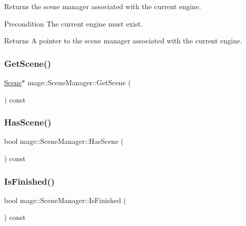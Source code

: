 Returns the scene manager associated with the current engine.

\begin{DoxyPrecond}{Precondition}
The current engine must exist. 
\end{DoxyPrecond}
\begin{DoxyReturn}{Returns}
A pointer to the scene manager associated with the current engine. 
\end{DoxyReturn}
\hypertarget{classmage_1_1_scene_manager_a55d720c9f90cfc46dbf07d46537072c1}{}\label{classmage_1_1_scene_manager_a55d720c9f90cfc46dbf07d46537072c1} 
\subsubsection{\texorpdfstring{Get\+Scene()}{GetScene()}}
{\footnotesize\ttfamily \hyperlink{classmage_1_1_scene}{Scene}$\ast$ mage\+::\+Scene\+Manager\+::\+Get\+Scene (\begin{DoxyParamCaption}{ }\end{DoxyParamCaption}) const\hspace{0.3cm}{\ttfamily [noexcept]}}

\hypertarget{classmage_1_1_scene_manager_ac767593112ea1d8b47cc79283cf7c47e}{}\label{classmage_1_1_scene_manager_ac767593112ea1d8b47cc79283cf7c47e} 
\subsubsection{\texorpdfstring{Has\+Scene()}{HasScene()}}
{\footnotesize\ttfamily bool mage\+::\+Scene\+Manager\+::\+Has\+Scene (\begin{DoxyParamCaption}{ }\end{DoxyParamCaption}) const\hspace{0.3cm}{\ttfamily [noexcept]}}

\hypertarget{classmage_1_1_scene_manager_adeb1fd1d9f40229ccb0ef8adfb55f4cc}{}\label{classmage_1_1_scene_manager_adeb1fd1d9f40229ccb0ef8adfb55f4cc} 
\subsubsection{\texorpdfstring{Is\+Finished()}{IsFinished()}}
{\footnotesize\ttfamily bool mage\+::\+Scene\+Manager\+::\+Is\+Finished (\begin{DoxyParamCaption}{ }\end{DoxyParamCaption}) const\hspace{0.3cm}{\ttfamily [noexcept]}}


